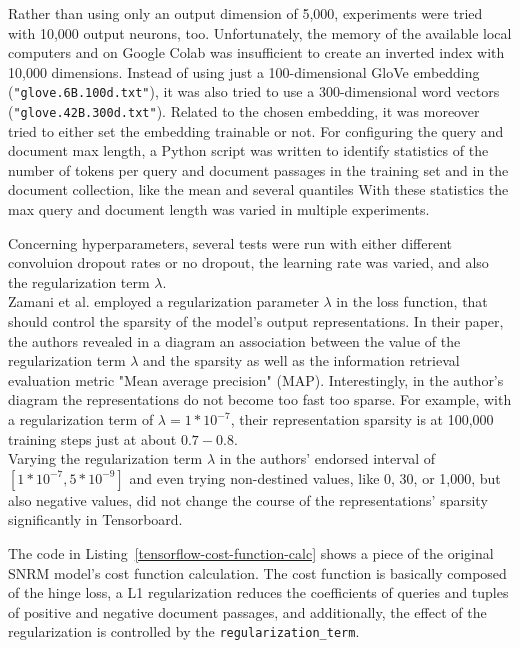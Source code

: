 Rather than using only an output dimension of 5,000, experiments were tried with 10,000 output neurons, too.
Unfortunately, the memory of the available local computers and on Google Colab was insufficient to create an inverted index
    with 10,000 dimensions.
Instead of using just a 100-dimensional GloVe embedding (\verb|"glove.6B.100d.txt"|), it was also tried to 
    use a 300-dimensional word vectors (\verb|"glove.42B.300d.txt"|).
Related to the chosen embedding, it was moreover tried to either set the embedding trainable or not.
For configuring the query and document max length, a Python script was written to identify statistics of the 
    number of tokens per query and document passages in the training set and in the document collection, 
    like the mean and several quantiles
With these statistics the max query and document length was varied in multiple experiments.

Concerning hyperparameters, several tests were run with either different convoluion dropout rates or no dropout, 
    the learning rate was varied, and also the regularization term $\lambda$.\\
Zamani et al. employed a regularization parameter $\lambda$
    in the loss function, that should control the sparsity of the model's output representations.
In their paper, the authors revealed in a diagram an association between the value of the regularization term $\lambda$ and the 
    sparsity as well as the information retrieval evaluation metric "Mean average precision" (MAP).
Interestingly, in the author's diagram the representations do not become too fast too sparse.
For example,  with a regularization term of $\lambda=1*10^{-7}$, their representation sparsity is at 100,000 training steps 
    just at about $0.7 - 0.8$. \cite{zamani:2018:from-neural-reranking-to-neural-ranking}\\
Varying the regularization term $\lambda$ in the authors' endorsed interval of $[1*10^{-7}, 5*10^{-9}]$ and 
    even trying non-destined values, like 0, 30, or 1,000, but also negative values, did not change the course 
    of the representations' sparsity significantly in Tensorboard.

The code in Listing~\ref{tensorflow-cost-function-calc} shows a piece of the original SNRM model's cost function calculation.
The cost function is basically composed of the hinge loss, a L1 regularization reduces the coefficients of queries and 
    tuples of positive and negative document passages, and additionally, the effect of the regularization is
    controlled by the \texttt{regularization\_term}.

